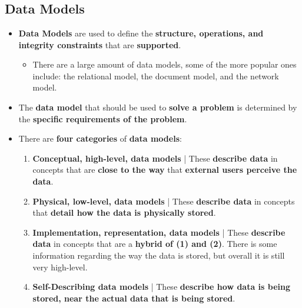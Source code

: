 \documentclass{article}
\begin{document}
    \section*{}

    \subsection*{Data Models}
    \begin{itemize}
        \item \textbf{Data Models} are used to define the \textbf{structure, operations, and integrity constraints} that are \textbf{supported}.
        \begin{itemize}
            \item There are a large amount of data models, some of the more popular ones include: the relational model, the document model, and the network model.
        \end{itemize}
        \item The \textbf{data model} that should be used to \textbf{solve a problem} is determined by the \textbf{specific requirements of the problem}.
        \item There are \textbf{four categories} of \textbf{data models}:
        \begin{enumerate}
            \item \textbf{Conceptual, high-level, data models} | These \textbf{describe data} in concepts that are \textbf{close to the way} that \textbf{external users perceive the data}.
            \item \textbf{Physical, low-level, data models} | These \textbf{describe data} in concepts that \textbf{detail how the data is physically stored}.
            \item \textbf{Implementation, representation, data models} | These \textbf{describe data} in concepts that are a \textbf{hybrid of (1) and (2)}. There is some information regarding the way the data is stored, but overall it is still very high-level.
            \item \textbf{Self-Describing data models} | These \textbf{describe how data is being stored, near the actual data that is being stored}.
        \end{enumerate}
    \end{itemize}
\end{document}
